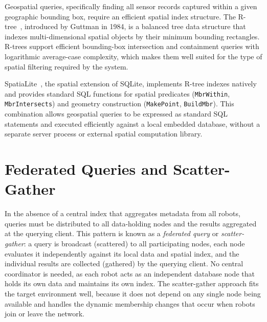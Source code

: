 Geospatial queries, specifically finding all sensor records captured within a given geographic bounding box, require an efficient spatial index structure. The R-tree~\cite{guttman1984rtrees}, introduced by Guttman in 1984, is a balanced tree data structure that indexes multi-dimensional spatial objects by their minimum bounding rectangles. R-trees support efficient bounding-box intersection and containment queries with logarithmic average-case complexity, which makes them well suited for the type of spatial filtering required by the system.

SpatiaLite~\cite{spatialite2024}, the spatial extension of SQLite, implements R-tree indexes natively and provides standard SQL functions for spatial predicates (\texttt{MbrWithin}, \texttt{MbrIntersects}) and geometry construction (\texttt{MakePoint}, \texttt{BuildMbr}). This combination allows geospatial queries to be expressed as standard SQL statements and executed efficiently against a local embedded database, without a separate server process or external spatial computation library.

\section{Federated Queries and Scatter-Gather} \label{sec:federated-queries}

In the absence of a central index that aggregates metadata from all robots, queries must be distributed to all data-holding nodes and the results aggregated at the querying client. This pattern is known as a \emph{federated query} or \emph{scatter-gather}: a query is broadcast (scattered) to all participating nodes, each node evaluates it independently against its local data and spatial index, and the individual results are collected (gathered) by the querying client. No central coordinator is needed, as each robot acts as an independent database node that holds its own data and maintains its own index. The scatter-gather approach fits the target environment well, because it does not depend on any single node being available and handles the dynamic membership changes that occur when robots join or leave the network.
